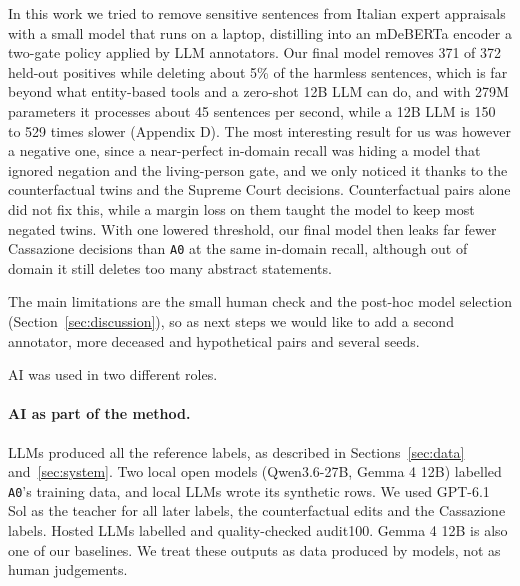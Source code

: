 \documentclass[11pt]{article}
\begin{document}
In this work we tried to remove sensitive sentences from Italian expert appraisals with a small model that runs on a laptop, distilling into an mDeBERTa encoder a two-gate policy applied by LLM annotators. Our final model removes 371 of 372 held-out positives while deleting about 5\% of the harmless sentences, which is far beyond what entity-based tools and a zero-shot 12B LLM can do, and with 279M parameters it processes about 45 sentences per second, while a 12B LLM is 150 to 529 times slower (Appendix D). The most interesting result for us was however a negative one, since a near-perfect in-domain recall was hiding a model that ignored negation and the living-person gate, and we only noticed it thanks to the counterfactual twins and the Supreme Court decisions. Counterfactual pairs alone did not fix this, while a margin loss on them taught the model to keep most negated twins. With one lowered threshold, our final model then leaks far fewer Cassazione decisions than \texttt{A0} at the same in-domain recall, although out of domain it still deletes too many abstract statements.

The main limitations are the small human check and the post-hoc model selection (Section~\ref{sec:discussion}), so as next steps we would like to add a second annotator, more deceased and hypothetical pairs and several seeds.


\aireport

AI was used in two different roles.

\paragraph{AI as part of the method.} LLMs produced all the reference labels, as described in Sections~\ref{sec:data} and~\ref{sec:system}. Two local open models (Qwen3.6-27B, Gemma 4 12B) labelled \texttt{A0}'s training data, and local LLMs wrote its synthetic rows. We used GPT-6.1 Sol as the teacher for all later labels, the counterfactual edits and the Cassazione labels. Hosted LLMs labelled and quality-checked audit100. Gemma 4 12B is also one of our baselines. We treat these outputs as data produced by models, not as human judgements.
\end{document}
